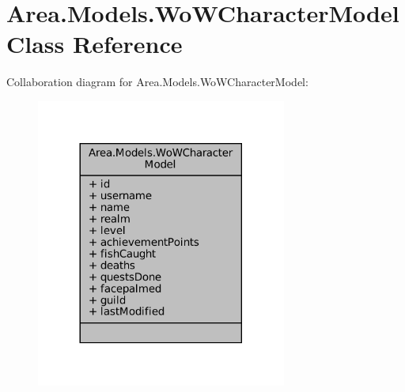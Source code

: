 \hypertarget{classArea_1_1Models_1_1WoWCharacterModel}{}\section{Area.\+Models.\+Wo\+W\+Character\+Model Class Reference}
\label{classArea_1_1Models_1_1WoWCharacterModel}


Collaboration diagram for Area.\+Models.\+Wo\+W\+Character\+Model\+:
\nopagebreak
\begin{figure}[H]
\begin{center}
\leavevmode
\includegraphics[width=233pt]{classArea_1_1Models_1_1WoWCharacterModel__coll__graph}
\end{center}
\end{figure}
